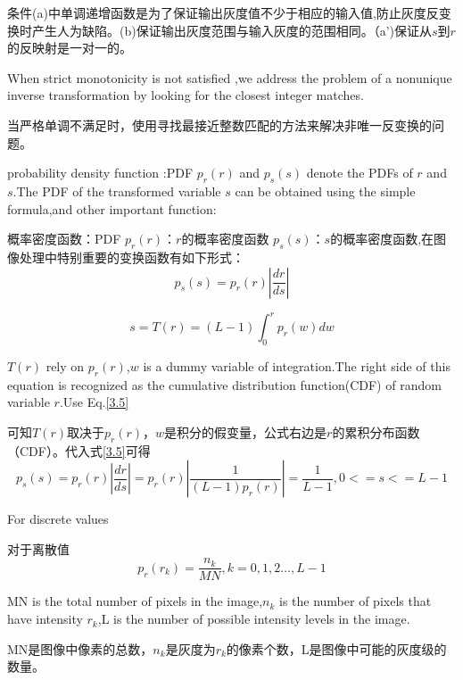 \documentclass[12pt]{article}
\numberwithin{equation}{section}%
\begin{document}
条件(a)中单调递增函数是为了保证输出灰度值不少于相应的输入值,防止灰度反变换时产生人为缺陷。(b)保证输出灰度范围与输入灰度的范围相同。（a')保证从$s$到$r$的反映射是一对一的。

When strict monotonicity is not satisfied ,we address the problem of a nonunique inverse transformation by looking for the closest integer matches.

当严格单调不满足时，使用寻找最接近整数匹配的方法来解决非唯一反变换的问题。

probability density function :PDF  \qquad  $p_{r}(r)$ and $p_{s}(s)$ denote the PDFs of $r$ and $s$.The PDF of the transformed variable $s$ can be obtained using the simple formula,and other important function:

概率密度函数：PDF \qquad $p_{r}(r)$：$r$的概率密度函数 \quad $p_{s}(s)$：$s$的概率密度函数,在图像处理中特别重要的变换函数有如下形式：
\begin{equation}  \label{3.5}  %
 p_{s}(s)=p_{r}(r)\left| \frac{dr}{ds} \right|
\end{equation}

\begin{equation} \label{3.6}   %
 s=T(r)=(L-1)\int_{0}^{r}p_{r}(w)dw 
\end{equation}

$T(r)$ rely on $p_{r}(r)$,$w$ is a dummy variable of integration.The right side of this equation is recognized as the cumulative  distribution function(CDF) of random variable $r$.Use Eq.\ref{3.5}

可知$T(r)$取决于$p_{r}(r)$，$w$是积分的假变量，公式右边是$r$的累积分布函数（CDF）。代入式\ref{3.5}可得
\begin{equation}  \label{3.7}  %
 p_{s}(s)=p_{r}(r)\left| \frac{dr}{ds} \right|=p_{r}(r)\left| \frac{1}{(L-1)p_{r}(r)} \right|=\frac{1}{L-1},0<=s<=L-1
\end{equation}

For discrete values

对于离散值
\begin{equation}    \label{3.8} %
 p_{r}(r_{k})= \frac{n_{k}}{MN},k=0,1,2\ldots,L-1
\end{equation}

MN is the total number of pixels in the image,$n_{k}$ is the number of pixels that have intensity $r_{k}$,L is the number of possible intensity levels in the image.

MN是图像中像素的总数，$n_{k}$是灰度为$r_{k}$的像素个数，L是图像中可能的灰度级的数量。
\end{document}
